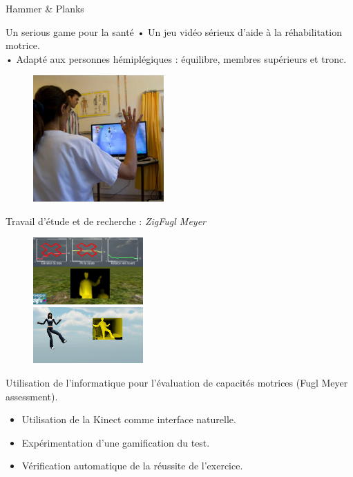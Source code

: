\documentclass{beamer}
\begin{document}
		\begin{frame}{Hammer \& Planks}
			\begin{block}{Un serious game pour la santé}
				• Un jeu vidéo sérieux d'aide à la réhabilitation motrice.\\
				• Adapté aux personnes hémiplégiques : équilibre, membres supérieurs et tronc.
			\end{block}
			
			\begin{figure}
				\includegraphics[width=5cm]{../images/test_lapeyronie_2.png}
			\end{figure}
		\end{frame}	
		
		\begin{frame}{Travail d'étude et de recherche : \emph{ZigFugl Meyer}}
			\begin{minipage}{0.40\linewidth}
				\begin{figure}
					\includegraphics[width=4.2cm]{../images/zigfugl-meyer_1.png}\\
					\includegraphics[width=4.2cm]{../images/zigfugl-meyer_2.png}
				\end{figure}
			\end{minipage}
			\begin{minipage}{6cm}%
				Utilisation de l'informatique pour l'évaluation de capacités motrices (Fugl Meyer assessment). 
					\begin{itemize}
						\item Utilisation de la Kinect comme interface naturelle.
						\item Expérimentation d'une gamification du test.
						\item Vérification automatique de la réussite de l'exercice.
					\end{itemize}
			\end{minipage}
		\end{frame}
	
\end{document}
